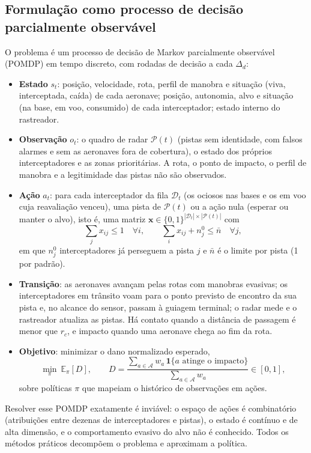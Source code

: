 \documentclass[11pt,a4paper]{article}
\begin{document}
\subsection{Formulação como processo de decisão parcialmente observável}
O problema é um processo de decisão de Markov parcialmente observável (POMDP) em tempo discreto, com rodadas de
decisão a cada $\Delta_d$:
\begin{itemize}
  \item \textbf{Estado} $s_t$: posição, velocidade, rota, perfil de manobra e situação (viva, interceptada, caída) de cada
        aeronave; posição, autonomia, alvo e situação (na base, em voo, consumido) de cada interceptador; estado interno
        do rastreador.
  \item \textbf{Observação} $o_t$: o quadro de radar $\mathcal{P}(t)$ (pistas sem identidade, com falsos alarmes e sem as
        aeronaves fora de cobertura), o estado dos próprios interceptadores e as zonas prioritárias. A rota, o ponto de
        impacto, o perfil de manobra e a legitimidade das pistas não são observados.
  \item \textbf{Ação} $a_t$: para cada interceptador da fila $\mathcal{D}_t$ (os ociosos nas bases e os em voo cuja
        reavaliação venceu), uma pista de $\mathcal{P}(t)$ ou a ação nula (esperar ou manter o alvo), isto é, uma matriz
        $\bm{x}\in\{0,1\}^{|\mathcal{D}_t|\times|\mathcal{P}(t)|}$ com
        \begin{equation}
          \sum_j x_{ij}\le1\quad\forall i,\qquad \sum_i x_{ij}+n_j^0\le\bar n\quad\forall j,
          \label{eq:restr}
        \end{equation}
        em que $n_j^0$ interceptadores já perseguem a pista $j$ e $\bar n$ é o limite por pista (1 por padrão).
  \item \textbf{Transição}: as aeronaves avançam pelas rotas com manobras evasivas; os interceptadores em trânsito voam
        para o ponto previsto de encontro da sua pista e, no alcance do sensor, passam à guiagem terminal; o radar mede e o
        rastreador atualiza as pistas. Há contato quando a distância de passagem é menor que $r_c$, e impacto quando uma
        aeronave chega ao fim da rota.
  \item \textbf{Objetivo}: minimizar o dano normalizado esperado,
        \begin{equation}
          \min_{\pi}\ \mathbb{E}_\pi[D],\qquad
          D = \frac{\sum_{a\in\mathcal{A}} w_a\,\mathbf{1}\{a\text{ atinge o impacto}\}}{\sum_{a\in\mathcal{A}} w_a}\in[0,1],
          \label{eq:dano}
        \end{equation}
        sobre políticas $\pi$ que mapeiam o histórico de observações em ações.
\end{itemize}
Resolver esse POMDP exatamente é inviável: o espaço de ações é combinatório (atribuições entre dezenas de
interceptadores e pistas), o estado é contínuo e de alta dimensão, e o comportamento evasivo do alvo não é conhecido.
Todos os métodos práticos decompõem o problema e aproximam a política.
\end{document}

